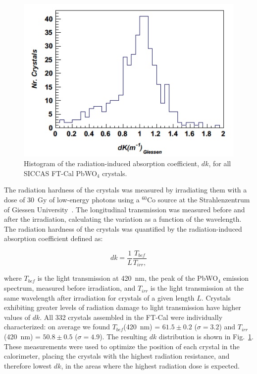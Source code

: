 \begin{figure}[th!]
\centering 
\includegraphics[width=0.85\columnwidth]{./fig/dk.jpeg} 
\caption{Histogram of the radiation-induced absorption coefficient, $dk$, for all SICCAS FT-Cal PbWO$_4$ crystals.}
\label{fig:dk} 
\end{figure}

The radiation hardness of the crystals was measured by irradiating them with a dose of 30~Gy of low-energy photons
using a $^{60}$Co source at the Strahlenzentrum of Giessen University~\cite{radhard}. The longitudinal transmission
was measured before and after the irradiation, calculating the variation as a function of the wavelength. The radiation
hardness of the crystals was quantified by the radiation-induced absorption coefficient defined as:

\begin{equation}
dk = \frac{1}{L}\frac{T_{bef}}{T_{irr},}
\end{equation}

\noindent
where $T_{bef}$ is the light transmission at 420~nm, the peak of the PbWO$_4$ emission spectrum, measured before
irradiation, and $T_{irr}$ is the light transmission at the same wavelength after irradiation for crystals of a given
length $L$. Crystals exhibiting greater levels of radiation damage to light transmission have higher values of $dk$.
All 332 crystals assembled in the FT-Cal were individually characterized: on average we found 
$T_{bef}$(420~nm) = $61.5 \pm 0.2$ ($\sigma=3.2$) and $T_{irr}$(420~nm) = $50.8 \pm 0.5$ ($\sigma=4.9$). 
The resulting $dk$ distribution is shown in Fig.~\ref{fig:dk}. These measurements were used to optimize the position
of each crystal in the calorimeter, placing the crystals with the highest radiation resistance, and therefore lowest
$dk$, in the areas where the highest radiation dose is expected.

